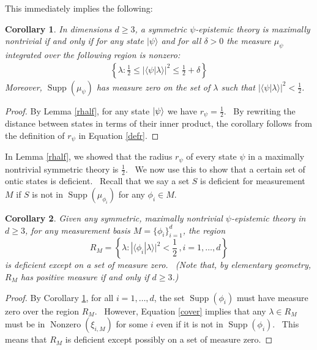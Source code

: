 \documentclass[letterpaper,12pt]{article}
\newtheorem{cor}{Corollary}
\newcommand{\ket}[1]{\mbox{$ | #1 \rangle $}}
\DeclareMathOperator{\supp}{Supp}
\DeclareMathOperator{\nz}{Nonzero}
\begin{document}
This immediately implies the following:


\begin{cor}
\label{maxnontriviallem} In dimensions $d\geq 3$, a symmetric $\psi$-epistemic theory is maximally
nontrivial if and only if for any state $ | \psi \rangle $ and for all $\delta >0$ the measure $%
\mu_\psi$ integrated over the following region is nonzero:
\begin{eqnarray}
\left\{\lambda:\frac{1}{2}\leq| \langle \psi | \lambda \rangle %
|^2\leq \frac{1}{2}+\delta\right\}  \label{maxnontrivial}
\end{eqnarray}
Moreover, $\supp(\mu_{\psi})$ has measure zero on the set of $\lambda$ such
that $| \langle \psi | \lambda \rangle |^2 <\frac{1}{2}$.
\end{cor}
\begin{proof}
By Lemma \ref{rhalf}, for any state $\ket{\psi}$ we have $r_{\psi}=\frac{1}{2}$. \ By rewriting the distance between states in terms of their inner product, the corollary follows from the definition of $r_{\psi}$ in Equation \ref{defr}.
\end{proof}


In Lemma \ref{rhalf}, we showed that the radius $r_\psi$ of every state $\psi$ in a maximally nontrivial symmetric theory is $\frac{1}{2}$. \ We now use this to show that a certain set of ontic states is deficient. \ Recall that we say a set $S$ is deficient for measurement $M$ if $S$ is not in $\supp(\mu_{\phi_i})$ for any $\phi_i \in M$.


\begin{cor}
\label{deficient} Given any symmetric, maximally nontrivial $\psi$-epistemic
theory in $d\geq 3$, for any measurement basis $M=\{\phi_i\}_{i=1}^d$, the
region \[R_M = \left\{\lambda:| \langle \phi_i | \lambda \rangle |^2 <%
\frac{1}{2}\,, i=1,\ldots,d\right\}\] is deficient except on a set of measure
zero. \ (Note that, by elementary geometry, $R_M$ has positive measure if and only if $d\geq 3$.)
\end{cor}

\begin{proof}
By Corollary \ref{maxnontriviallem}, for all $i=1,\ldots,d$, the set $\supp(\phi_i)$ must have measure zero over the region $R_M$. \ However, Equation \ref{cover} implies that any $\lambda\in R_M$ must be in $\nz(\xi_{i,M})$ for some $i$ even if it is not in $\supp(\phi_i)$. \ This means that $R_M$ is deficient except possibly on a set of measure zero.
\end{proof}
\end{document}
